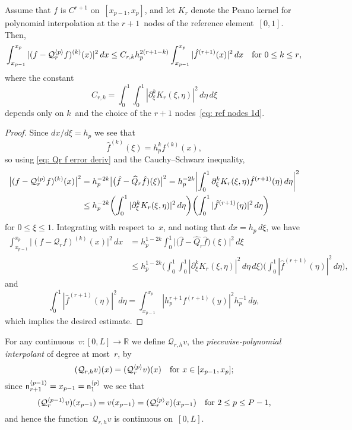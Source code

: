 \begin{theorem}
Assume that $f$ is $C^{r+1}$ on~$[x_{p-1},x_p]$, and let $K_r$ denote the Peano 
kernel for polynomial interpolation at the $r+1$~nodes of the reference 
element~$[0,1]$.  Then,
\[
\int_{x_{p-1}}^{x_p}|(f-\mathcal{Q}_r^{\langle p\rangle}f)^{(k)}(x)|^2\,dx
    \le C_{r,k}h_p^{2(r+1-k)}\int_{x_{p-1}}^{x_p}|\hat f^{(r+1)}(x)|^2\,dx
    \quad\text{for $0\le k\le r$,}
\]
where the constant
\[
C_{r,k}=\int_0^1\int_0^1|\partial_\xi^kK_r(\xi,\eta)|^2\,d\eta\,d\xi
\]
depends only on $k$~and the choice of the $r+1$ nodes~\eqref{eq: ref nodes 1d}.
\end{theorem}
\begin{proof}
Since $dx/d\xi=h_p$ we see that
\[
\hat f^{(k)}(\xi)=h_p^k f^{(k)}(x),
\]
so using \eqref{eq: Qr f error deriv} and the Cauchy--Schwarz inequality,
\begin{align*}
\bigl|(f-\mathcal{Q}_r^{\langle p\rangle}f)^{(k)}(x)\bigr|^2
    &=h_p^{-2k}\bigl|\bigl(\hat f-\widehat{Q}_r\hat f)(\xi)\bigr|^2
    =h_p^{-2k}\biggl|\int_0^1\partial_\xi^k K_r(\xi,\eta)
        \hat f^{(r+1)}(\eta)\, d\eta\biggr|^2\\
    &\le h_p^{-2k}\biggl(\int_0^1|\partial_\xi^kK_r(\xi,\eta)|^2\,d\eta\biggr)
    \biggl(\int_0^1|\hat f^{(r+1)}(\eta)|^2\,d\eta\biggr)
\end{align*}
for $0\le\xi\le1$.  Integrating with respect to~$x$, and noting that 
$dx=h_p\,d\xi$, we have
\begin{align*}
\int_{x_{p-1}}^{x_p}\bigl|(f-\mathcal{Q}_rf)^{(k)}(x)\bigr|^2\,dx
&=h_p^{1-2k}\int_0^1\bigl|\bigl(\hat f-\widehat{Q}_r\hat f)(\xi)\bigr|^2\,d\xi\\
&\le h_p^{1-2k}\biggl(
    \int_0^1\int_0^1|\partial_\xi^kK_r(\xi,\eta)|^2\,d\eta\,d\xi\biggr)
    \biggl(\int_0^1|\hat f^{(r+1)}(\eta)|^2\,d\eta\biggr),
\end{align*}
and 
\[
\int_0^1|\hat f^{(r+1)}(\eta)|^2\,d\eta=\int_{x_{p-1}}^{x_p}
    |h_p^{r+1}f^{(r+1)}(y)|^2h_p^{-1}\,dy,
\]
which implies the desired estimate.
\end{proof}

For any continuous~$v:[0,L]\to\mathbb{R}$ we define $\mathcal{Q}_{r,h}v$, the 
\emph{piecewise-polynomial interpolant} of degree at most~$r$, by
\[
(\mathcal{Q}_{r,h}v)(x)
    =(\mathcal{Q}_r^{\langle p\rangle}v)(x)\quad\text{for $x\in[x_{p-1},x_p]$;}
\]
since $\mathsf{n}^{\langle p-1\rangle}_{r+1}=x_{p-1}=\mathsf{n}^{\langle p\rangle}_1$ we see 
that
\[
(\mathcal{Q}_r^{\langle p-1\rangle}v)(x_{p-1})=v(x_{p-1})
    =(\mathcal{Q}_r^{\langle p\rangle}v)(x_{p-1})\quad\text{for~$2\le p\le P-1$,}
\]
and hence the function~$\mathcal{Q}_{r,h}v$ is continuous on~$[0,L]$.

